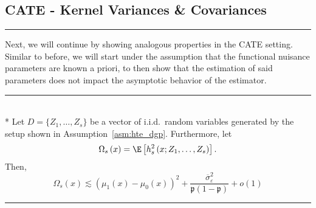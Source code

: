 \newpage
\subsection{CATE - Kernel Variances \& Covariances}
\hrule
Next, we will continue by showing analogous properties in the CATE setting.
Similar to before, we will start under the assumption that the functional nuisance parameters are known a priori, to then show that the estimation of said parameters does not impact the asymptotic behavior of the estimator.
\vspace{0.5cm}
\hrule

\begin{lem}\label{lem:CATE_omega_s}\mbox{}\\*
	Let $D = \{Z_1, \dotsc, Z_{s}\}$ be a vector of i.i.d.\ random variables generated by the setup shown in Assumption~\ref{asm:hte_dgp}.
	Furthermore, let
	\begin{equation}
		\Omega_{s}\left(x\right)
		= \E\left[h_{s}^{2}\left(x; Z_1, \ldots,  Z_{s}\right)\right].
	\end{equation}
	Then,
	\begin{equation}
		\Omega_{s}\left(x\right)
		\lesssim \left(\mu_{1}\left(x\right) - \mu_{0}\left(x\right)\right)^2 + \frac{\overline{\sigma}^2_{\varepsilon}}{\mathfrak{p}\left(1 - \mathfrak{p}\right)} + o(1)
	\end{equation}
\end{lem}
\hrule
